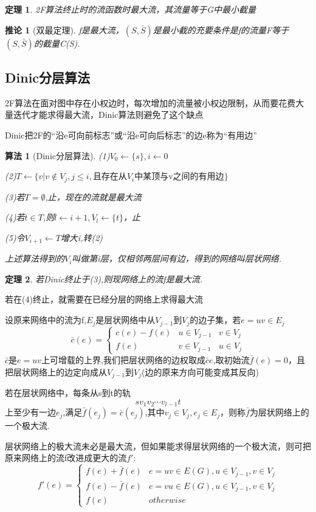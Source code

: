 \documentclass[UTF8]{ctexart}
\newtheorem{thr}{定理}
\newtheorem*{coro}{推论}
\newtheorem{alg}{算法}
\begin{document}
\begin{thr}
2F算法终止时的流函数时最大流，其流量等于G中最小截量
\end{thr}
\begin{coro}[双最定理]
f是最大流，$(S,\bar{S})$是最小截的充要条件是f的流量F等于$(S,\bar{S})$的截量C(S).
\end{coro}
\subsection{Dinic分层算法}
2F算法在面对图中存在小权边时，每次增加的流量被小权边限制，从而要花费大量迭代才能求得最大流，Dinic算法则避免了这个缺点

Dinic把2F的“沿e可向前标志”或“沿e可向后标志”的边e称为“有用边”
\begin{alg}[Dinic分层算法]
\item (1)$V_0 \leftarrow \{s\},i\leftarrow 0$
\item (2)$T\leftarrow \{v|v \notin V_j,j\leq i,\text{且存在从$V_i$中某顶与v之间的有用边} \}$
\item (3)若$T = \emptyset$,止，现在的流就是最大流
\item (4)若$t\in T$,则$l\leftarrow i+1,V_l \leftarrow \{t\}$，止
\item (5)令$V_{i+1}\leftarrow T$增大i,转(2)

上述算法得到的$V_i$叫做第i层，仅相邻两层间有边，得到的网络叫层状网络.
\end{alg}
\begin{thr}
若Dinic终止于(3),则现网络上的流f是最大流.
\end{thr}
若在(4)终止，就需要在已经分层的网络上求得最大流

设原来网络中的流为f,$E_j$是层状网络中从$V_{j-1}$到$V_j$的边子集，若$e=uv \in E_j$
\[
\bar{c}(e) = \left \{
\begin{array}{lll}
c(e)-f(e) &u\in V_{j-1}&v\in V_{j}\\
f(e) &v \in V_{j-1}&u\in V_{j}
\end{array}
\right.\]
$\bar{c}$是$e=uv$上可增载的上界,我们把层状网络的边权取成$\bar{c}e$,取初始流$\bar{f}(e)=0$，且把层状网络上的边定向成从$V_{j-1}$到$V_j$(边的原来方向可能变成其反向)

若在层状网络中，每条从s到t的轨$$sv_1v_2\cdots v_{l-1}t$$上至少有一边$e_j$,满足$\bar{f}(e_j) = \bar{c}(e_j)$,其中$v_j \in V_j,e_j \in E_j$，则称$\bar{f}$为层状网络上的一个极大流.

层状网络上的极大流未必是最大流，但如果能求得层状网络的一个极大流，则可把原来网络上的流f改进成更大的流$f'$:
\[
f'(e)=\left \{
\begin{array}{ll}
f(e)+\bar{f}(e)&e=uv\in E(G),u\in V_{j-1},v\in V_j\\
f(e)-\bar{f}(e)&e=vu\in E(G),u\in V_{j-1},v\in V_j\\
f(e)&otherwise
\end{array}
\right.\]
\end{document}
